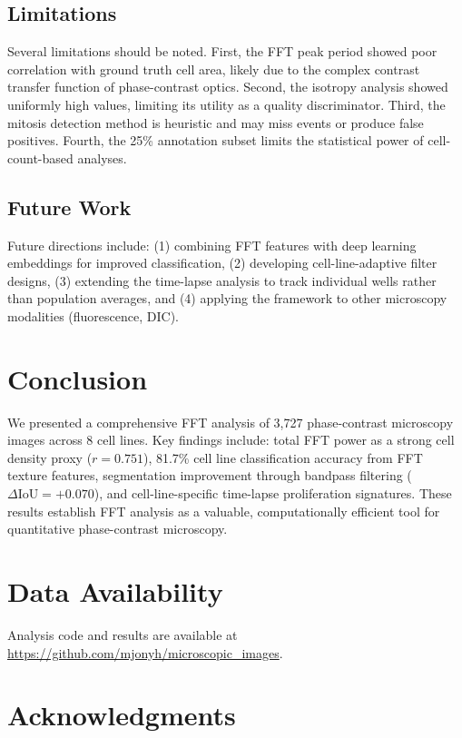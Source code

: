 \documentclass[11pt,a4paper]{article}
\begin{document}
\subsection{Limitations}

Several limitations should be noted. First, the FFT peak period showed poor
correlation with ground truth cell area, likely due to the complex contrast
transfer function of phase-contrast optics. Second, the isotropy analysis
showed uniformly high values, limiting its utility as a quality discriminator.
Third, the mitosis detection method is heuristic and may miss events or produce
false positives. Fourth, the 25\% annotation subset limits the statistical power
of cell-count-based analyses.

\subsection{Future Work}

Future directions include: (1) combining FFT features with deep learning
embeddings for improved classification, (2) developing cell-line-adaptive
filter designs, (3) extending the time-lapse analysis to track individual
wells rather than population averages, and (4) applying the framework to
other microscopy modalities (fluorescence, DIC).

\section{Conclusion}

We presented a comprehensive FFT analysis of 3,727 phase-contrast microscopy
images across 8 cell lines. Key findings include: total FFT power as a
strong cell density proxy ($r = 0.751$), 81.7\% cell line classification
accuracy from FFT texture features, segmentation improvement through
bandpass filtering ($\Delta\text{IoU} = +0.070$), and cell-line-specific
time-lapse proliferation signatures. These results establish FFT analysis
as a valuable, computationally efficient tool for quantitative phase-contrast
microscopy.

\section*{Data Availability}

Analysis code and results are available at
\url{https://github.com/mjonyh/microscopic_images}.

\section*{Acknowledgments}
\end{document}
